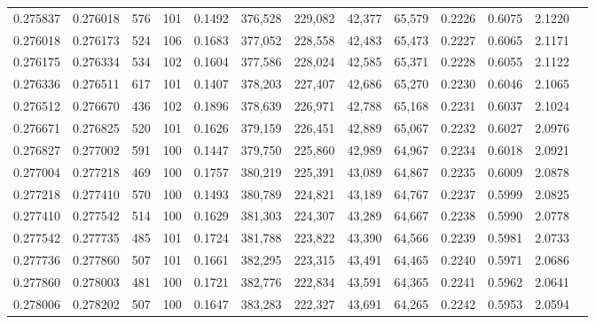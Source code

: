 \begin{tabular}{rrrrrrrrrrrrr}
0.275837 & 0.276018 &   576 & 101 &                                     0.1492 & 376,528 & 229,082 &  42,377 &  65,579 & 0.2226 & 0.6075 & 2.1220 \\
0.276018 & 0.276173 &   524 & 106 &                                     0.1683 & 377,052 & 228,558 &  42,483 &  65,473 & 0.2227 & 0.6065 & 2.1171 \\
0.276175 & 0.276334 &   534 & 102 &                                     0.1604 & 377,586 & 228,024 &  42,585 &  65,371 & 0.2228 & 0.6055 & 2.1122 \\
0.276336 & 0.276511 &   617 & 101 &                                     0.1407 & 378,203 & 227,407 &  42,686 &  65,270 & 0.2230 & 0.6046 & 2.1065 \\
0.276512 & 0.276670 &   436 & 102 &                                     0.1896 & 378,639 & 226,971 &  42,788 &  65,168 & 0.2231 & 0.6037 & 2.1024 \\
0.276671 & 0.276825 &   520 & 101 &                                     0.1626 & 379,159 & 226,451 &  42,889 &  65,067 & 0.2232 & 0.6027 & 2.0976 \\
0.276827 & 0.277002 &   591 & 100 &                                     0.1447 & 379,750 & 225,860 &  42,989 &  64,967 & 0.2234 & 0.6018 & 2.0921 \\
0.277004 & 0.277218 &   469 & 100 &                                     0.1757 & 380,219 & 225,391 &  43,089 &  64,867 & 0.2235 & 0.6009 & 2.0878 \\
0.277218 & 0.277410 &   570 & 100 &                                     0.1493 & 380,789 & 224,821 &  43,189 &  64,767 & 0.2237 & 0.5999 & 2.0825 \\
0.277410 & 0.277542 &   514 & 100 &                                     0.1629 & 381,303 & 224,307 &  43,289 &  64,667 & 0.2238 & 0.5990 & 2.0778 \\
0.277542 & 0.277735 &   485 & 101 &                                     0.1724 & 381,788 & 223,822 &  43,390 &  64,566 & 0.2239 & 0.5981 & 2.0733 \\
0.277736 & 0.277860 &   507 & 101 &                                     0.1661 & 382,295 & 223,315 &  43,491 &  64,465 & 0.2240 & 0.5971 & 2.0686 \\
0.277860 & 0.278003 &   481 & 100 &                                     0.1721 & 382,776 & 222,834 &  43,591 &  64,365 & 0.2241 & 0.5962 & 2.0641 \\
0.278006 & 0.278202 &   507 & 100 &                                     0.1647 & 383,283 & 222,327 &  43,691 &  64,265 & 0.2242 & 0.5953 & 2.0594 \\

\end{tabular}
